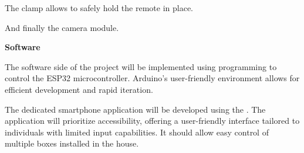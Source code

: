 \begin{minipage}[t]{0.5\textwidth}
    \vspace{5mm}
    The clamp allows to safely hold the remote in place.
\end{minipage}
\begin{minipage}[t]{0.45\textwidth}
    \centering{}
\end{minipage}\hfill


\begin{minipage}[t]{0.40\textwidth}
    \centering{}
\end{minipage}\hfill
\begin{minipage}[t]{0.5\textwidth}
    \vspace{5mm}
    And finally the camera module.
\end{minipage}

\textbf{Software}

The software side of the project will be implemented using  programming to control the ESP32 microcontroller.
Arduino's user-friendly environment allows for efficient development and rapid iteration.

The dedicated smartphone application will be developed using the .
The application will prioritize accessibility, offering a user-friendly interface tailored to individuals with limited input capabilities.
It should allow easy control of multiple boxes installed in the house.

